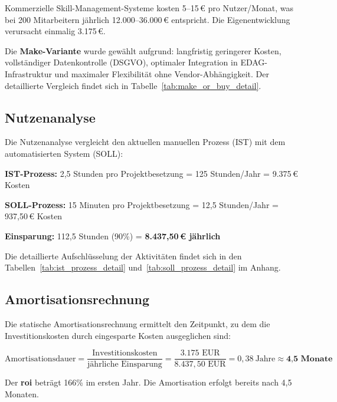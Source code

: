 Kommerzielle Skill-Management-Systeme kosten 5--15\,€ pro Nutzer/Monat\cite{skill_mgmt_market}, was bei 200 Mitarbeitern jährlich 12.000--36.000\,€ entspricht. Die Eigenentwicklung verursacht einmalig 3.175\,€.

Die \textbf{Make-Variante} wurde gewählt aufgrund: langfristig geringerer Kosten, vollständiger Datenkontrolle (DSGVO\cite{dsgvo}), optimaler Integration in EDAG-Infrastruktur und maximaler Flexibilität ohne Vendor-Abhängigkeit. Der detaillierte Vergleich findet sich in Tabelle~\ref{tab:make_or_buy_detail}.

\subsection{Nutzenanalyse}
\label{sec:nutzen_analyse}

Die Nutzenanalyse vergleicht den aktuellen manuellen Prozess (IST) mit dem automatisierten System (SOLL):

\textbf{IST-Prozess:} 2,5 Stunden pro Projektbesetzung = 125 Stunden/Jahr = 9.375\,€ Kosten\cite{projektbesetzung_aufwand,projektleiter_stundensatz}

\textbf{SOLL-Prozess:} 15 Minuten pro Projektbesetzung = 12,5 Stunden/Jahr = 937,50\,€ Kosten

\textbf{Einsparung:} 112,5 Stunden (90\%) = \textbf{8.437,50\,€ jährlich}

Die detaillierte Aufschlüsselung der Aktivitäten findet sich in den Tabellen~\ref{tab:ist_prozess_detail} und~\ref{tab:soll_prozess_detail} im Anhang.

\subsection{Amortisationsrechnung}
\label{sec:amortisation}

Die statische Amortisationsrechnung ermittelt den Zeitpunkt, zu dem die Investitionskosten durch eingesparte Kosten ausgeglichen sind:

\[
\text{Amortisationsdauer} = \frac{\text{Investitionskosten}}{\text{jährliche Einsparung}} = \frac{3.175\text{ EUR}}{8.437{,}50\text{ EUR}} = 0{,}38~\text{Jahre} \approx \textbf{4{,}5 Monate}
\]

Der \textbf{\gls{roi}} beträgt 166\% im ersten Jahr. Die Amortisation erfolgt bereits nach 4,5 Monaten.

